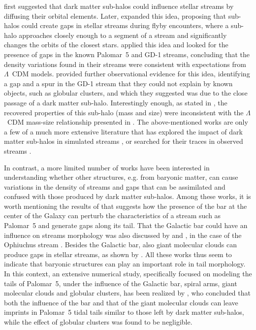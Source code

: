 \documentclass[draft]{aa}
\begin{document}
  \citet{2002MNRAS.332..915I} first suggested that dark matter sub-halos could influence stellar streams by diffusing their orbital elements. Later, \citet{2012ApJ...748...20C} expanded this idea, proposing that sub-halos could create gaps in stellar streams during flyby encounters, where a sub-halo approaches closely enough to a segment of a stream and significantly changes the orbits of the closest stars.  \citet{2012ApJ...760...75C, 2013ApJ...768..171C} applied this idea and looked for the presence of gaps in the known Palomar~5 and GD-1 streams, concluding that the density variations found in their streams were consistent with expectations from $\Lambda$~CDM models.  \citet{2019ApJ...880...38B} provided further observational evidence for this idea, identifying a gap and a spur in the GD-1 stream that they could not explain by known objects, such as globular clusters, and which they suggested was due to the close passage of a dark matter sub-halo. Interestingly enough, as stated in \citet{2019ApJ...880...38B}, the recovered properties of this sub-halo (mass and size) were inconsistent with the $\Lambda$~CDM mass-size relationship presented in \cite{2017MNRAS.466.4974M}. The above-mentioned works are only a few of a much more extensive literature that has explored the impact of dark matter sub-halos in simulated streams \citep{2016ApJ...828L..10H, 2021MNRAS.507.1999H, 2021JCAP...10..043B, 2024arXiv240402953H, 2024arXiv241021174N}, or searched for their traces in observed streams \citep{2016MNRAS.460.2711T, 2017MNRAS.470...60E, 2020ApJ...889...70B, 2020ApJ...892L..37B}.

  In contrast, a more limited number of works have been interested in understanding whether other structures, e.g. from baryonic matter, can cause variations in the density of streams and gaps that can be assimilated and confused with those produced by dark matter sub-halos.  Among these works, it is worth mentioning the results of \citet{2017NatAs...1..633P} that suggests how the presence of the bar at the center of the Galaxy can perturb the characteristics of a stream such as Palomar~5 and generate gaps along its tail. That the Galactic bar could have an influence on streams morphology was also discussed by \citet{2016MNRAS.460..497H} and \citet{2016ApJ...824..104P}, in the case of the Ophiuchus stream \citep{2014MNRAS.443L..84B}. Besides the Galactic bar, also giant molecular clouds can produce gaps in stellar streams, as shown by \citet{2016MNRAS.463L..17A}. All these works thus seem to indicate that baryonic structures can play an important role in tail morphology. In this context,  an extensive numerical study, specifically focused on modeling the tails of Palomar~5, under the influence of the Galactic bar, spiral arms, giant molecular clouds and globular clusters, has been realized by \citet{2019MNRAS.484.2009B}, who concluded that both the influence of the bar and that of the giant molecular clouds can leave imprints in Palomar~5 tidal tails similar to those left by dark matter sub-halos, while the effect of globular clusters was found to be negligible. 
  
\end{document}
